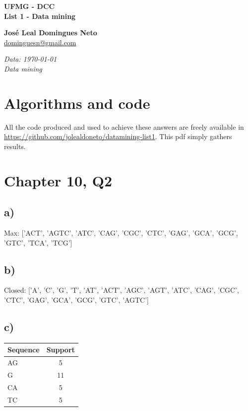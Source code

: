 \documentclass[a4paper,11pt,oneside]{article}
\begin{document}
  \thispagestyle{empty}
  \begin{flushleft}
    \textbf{\huge UFMG - DCC}\\
    \vspace*{6mm}
    \textbf{\huge List 1 - Data mining}
  \end{flushleft}
  \vspace*{6mm}
  \begin{flushleft}
    \textbf{\large Jos\'e Leal Domingues Neto}\\
    \href{mailto:dominguesn@gmail.com}{dominguesn@gmail.com} \\[2ex]
  \end{flushleft}
  \vspace*{1mm}
  \begin{flushleft}
    \textit{
      Data: \today \\
      Data mining}
  \end{flushleft}
  \vspace*{2mm}
\newpage


\section*{Algorithms and code}
All the code produced and used to achieve these answers are freely available in \href{https://github.com/jolealdoneto/datamining-list1}{https://github.com/jolealdoneto/datamining-list1}. This pdf simply gathers results.


\section*{Chapter 10, Q2}
\subsection*{a)} 
  Max:  ['ACT', 'AGTC', 'ATC', 'CAG', 'CGC', 'CTC', 'GAG', 'GCA', 'GCG', 'GTC', 'TCA', 'TCG']
\subsection*{b)} 
  Closed:  ['A', 'C', 'G', 'T', 'AT', 'ACT', 'AGC', 'AGT', 'ATC', 'CAG', 'CGC', 'CTC', 'GAG', 'GCA', 'GCG', 'GTC', 'AGTC']
\subsection*{c)} 
\begin{tabular}{l c}
Sequence & Support\\
\hline
AG & 5\\
G & 11\\
CA & 5\\
TC & 5\\
\end{tabular}
\end{document}
